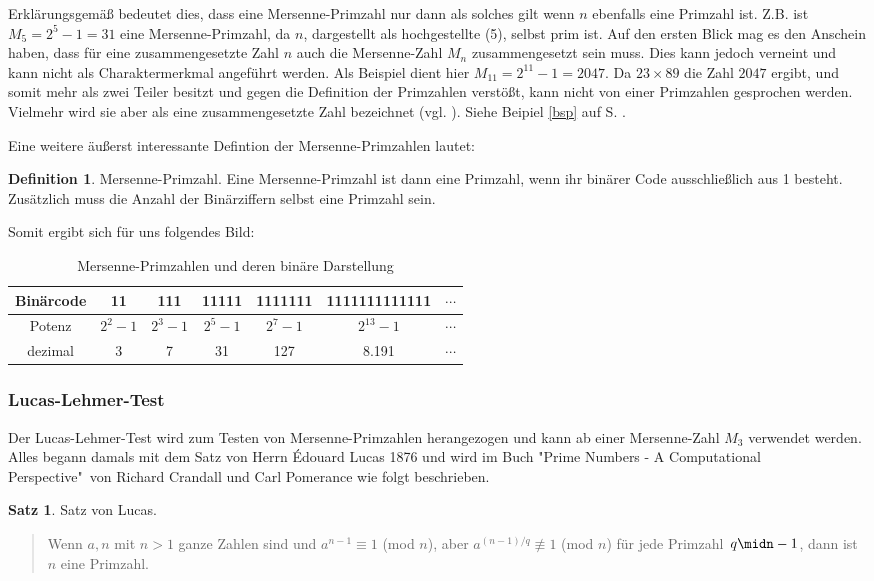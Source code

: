 \documentclass[12pt,a4paper]{article}
\theoremstyle{definition}
\newtheorem{defi}{Definition}[section]
\newtheorem{satz}{Satz}[subsection]
\begin{document}
Erklärungsgemäß bedeutet dies, dass eine Mersenne-Primzahl nur dann als solches gilt wenn $n$ ebenfalls eine Primzahl ist.
Z.B. ist $M_5 = 2^{5}-1 = 31$ eine Mersenne-Primzahl, da $n$, dargestellt als hochgestellte (5), selbst prim ist.
Auf den ersten Blick mag es den Anschein haben, dass für eine zusammengesetzte Zahl $n$ auch die Mersenne-Zahl $M_n$ zusammengesetzt sein muss.
Dies kann jedoch verneint und kann nicht als Charaktermerkmal angeführt werden. Als Beispiel dient hier $M_{11} = 2^{11}-1 = 2047$.
Da $23 \times 89$ die Zahl $2047$ ergibt, und somit mehr als zwei Teiler besitzt und gegen die Definition der Primzahlen verstößt, kann nicht von einer Primzahlen gesprochen werden.
Vielmehr wird sie aber als eine zusammengesetzte Zahl bezeichnet (vgl. \cite[168--169]{RempeGillen2009}).
Siehe Beipiel \ref{bsp} auf S. \pageref{bsp}.

Eine weitere äußerst interessante Defintion der Mersenne-Primzahlen lautet:
\begin{defi}{Mersenne-Primzahl}.\newline
Eine Mersenne-Primzahl ist dann eine Primzahl, wenn ihr binärer Code ausschließlich aus 1 besteht.\newline
Zusätzlich muss die Anzahl der Binärziffern selbst eine Primzahl sein.
\end{defi}

Somit ergibt sich für uns folgendes Bild:
\begin{table}[h]\begin{center}
\begin{tabular}{c|c|c|c|c|c|c}
Binärcode & 11 & 111 & 11111 & 1111111 & 1111111111111 & $\cdots$ \\
\hline
Potenz & $2^2-1$ & $2^3-1$ & $2^5-1$ & $2^7-1$ & $2^{13}-1$ & $\cdots$ \\
\hline
dezimal & 3 & 7 & 31 & 127 & 8.191 & $\cdots$
\end{tabular}\end{center}
\caption{Mersenne-Primzahlen und deren binäre Darstellung}
\label{tab:Mersenne-Primzahlen und deren binäre Darstellung}
\end{table}

\subsubsection{Lucas-Lehmer-Test}\label{Lucas-Lehmer-Test}
Der Lucas-Lehmer-Test wird zum Testen von Mersenne-Primzahlen herangezogen und kann ab einer Mersenne-Zahl $M_3$ verwendet werden.
Alles begann damals mit dem Satz von Herrn Édouard Lucas 1876 und wird im Buch "Prime Numbers - A Computational Perspective"\ von Richard Crandall und Carl Pomerance wie folgt beschrieben.
\begin{satz}{Satz von Lucas}.
\begin{quote}
\small
Wenn $a, n$ mit $n > 1$ ganze Zahlen sind und\newline
$a^{n-1} \equiv 1$ (mod $n$), aber $a^{(n-1)/q} \not\equiv 1$ (mod $n$) für jede Primzahl $q\midn-1$,\newline
dann ist $n$ eine Primzahl.\newline
\autocite[173]{Crandall2005}
\end{quote}
\end{satz}
\end{document}
